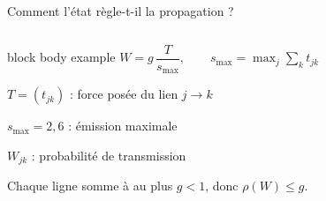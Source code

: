 \documentclass[aspectratio=169,10pt,t]{beamer}
\begin{document}
\begin{frame}{Comment l'état règle-t-il la propagation ?}
\begin{columns}[T,onlytextwidth]
  \begin{beamercolorbox}[wd=\linewidth,rounded=true,sep=2mm]{block body example}
  \centering $W=g\,\dfrac{T}{s_{\max}},\qquad s_{\max}=\max_j\sum_k t_{jk}$\par\vspace{2mm}
  \raggedright\footnotesize
  $T=(t_{jk})$ : force posée du lien $j\to k$\par
  $s_{\max}=2{,}6$ : émission maximale\par
  $W_{jk}$ : probabilité de transmission\par\vspace{1mm}
  Chaque ligne somme à au plus $g<1$, donc $\rho(W)\le g$.
  \end{beamercolorbox}
  \end{columns}
\end{frame}
\end{document}

